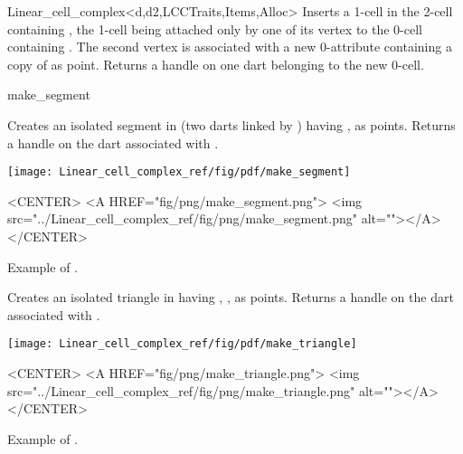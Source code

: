 \begin{ccRefClass}{Linear_cell_complex<d,d2,LCCTraits,Items,Alloc>}
{Inserts a 1-cell in the 2-cell containing , the 1-cell
  being attached only by one of its vertex to the 0-cell containing .
  The second vertex is associated with a new 0-attribute containing a copy of
   as point. Returns a handle on one dart belonging to the new 0-cell.
}

{make_segment}{}

{Creates an isolated segment in  (two darts linked by \betadeux{}) 
  having ,  as points.
  Returns a handle on the dart associated with .
}
% 
\def\LargFig{.3\textwidth}
\begin{ccTexOnly}
  \begin{center}
    \texttt{[image: Linear\_cell\_complex\_ref/fig/pdf/make\_segment]}
  \end{center}
\end{ccTexOnly}
\begin{ccHtmlOnly}
  <CENTER>
  <A HREF="fig/png/make_segment.png">
  <img src="../Linear_cell_complex_ref/fig/png/make_segment.png" alt=""></A>
  </CENTER>
\end{ccHtmlOnly}
\centerline{Example of .}

{Creates an isolated triangle in  having , ,  as points.
   Returns a handle on the dart associated with .
}
%
\def\LargFig{.3\textwidth}
  \begin{ccTexOnly}
    \begin{center}
      \texttt{[image: Linear\_cell\_complex\_ref/fig/pdf/make\_triangle]}
    \end{center}
  \end{ccTexOnly}
  \begin{ccHtmlOnly}
    <CENTER>
    <A HREF="fig/png/make_triangle.png">
        <img src="../Linear_cell_complex_ref/fig/png/make_triangle.png" alt=""></A>
    </CENTER>
    \end{ccHtmlOnly}
    \centerline{Example of .}


\end{ccRefClass}
